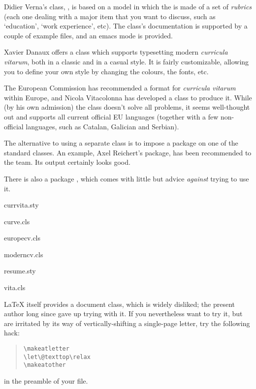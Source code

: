 Didier Verna's class, , is based on a model in which
the  is made of a set of \emph{rubrics} (each one dealing
with a major item that you want to discuss, such as `education', `work
experience', etc).  The class's documentation is supported by a couple
of example files, and an emacs mode is provided.

Xavier Danaux offers a class  which supports
typesetting modern \emph{curricula vitarum}, both in a classic and in a
casual style. It is fairly customizable, allowing you to define your
own style by changing the colours, the fonts, etc.

The European Commission has recommended a format for %
\emph{curricula vitarum} within Europe, and Nicola Vitacolonna has
developed a class  to produce it.  While (by his own
admission) the class doesn't solve all problems, it seems well-thought
out and supports all current official EU languages (together with a
few non-official languages, such as Catalan, Galician and Serbian).

The alternative to using a separate class is to impose a package on
one of the standard classes.  An example,
Axel Reichert's  package, has been recommended to the
 team.  Its output certainly looks good.

There is also a \LaTeXo{} package , which comes with
little but advice \emph{against} trying to use it.
\begin{ctanrefs}
\item[currvita.sty]
\item[curve.cls]
\item[europecv.cls]
\item[moderncv.cls]
\item[resume.sty]
\item[vita.cls]
\end{ctanrefs}


\LaTeX{} itself provides a  document class, which is
widely disliked; the present author long since gave up trying with
it.  If you nevertheless want to try it, but are irritated by its way
of vertically-shifting a single-page letter, try the following hack:
\begin{quote}
\begin{verbatim}
\makeatletter
\let\@texttop\relax
\makeatother
\end{verbatim}
\end{quote}
in the preamble of your file.

